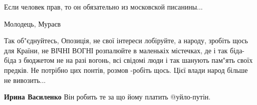 \begin{itemize}
Если человек прав, то он обязательно из московской писанины...

Молодець, Мураєв


Так об"єднуйтесь, Опозиція, не свої інтереси лобіруйте, а народу, зробіть щось
для Країни, не ВІЧНІ ВОГНІ розпалюйте в маленькіх містечках, де і так біда-біда
з бюджетом не на разі вогонь, всі свідомі люди і так шанують пам"ять своїх
предків. Не потрібно цих понтів, розмов -робіть щось. Цієї влади народ більше не
вивозить...

\begin{itemize} %
\textbf{Ирина Василенко} Він робить те за що йому платить @уйло-путін.
\end{itemize} %

\end{itemize} %
